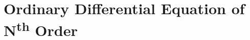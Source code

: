 \documentclass[./\jobname.tex]{subfiles}
\begin{document}
%
\chapter{Ordinary Differential Equation of N\textsuperscript{th} Order}
%
\end{document}
